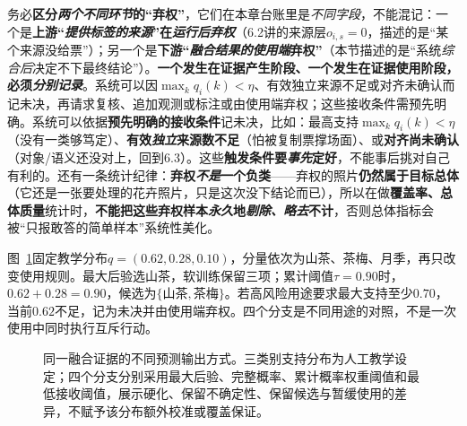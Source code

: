 务必\textbf{区分\emph{两个不同环节}的“弃权”}，它们在本章台账里是\emph{不同字段}，不能混记：一个是\textbf{上游“\emph{提供标签的来源}”在\emph{运行后弃权}}（6.2讲的来源层$o_{i,s}=0$，描述的是“某个来源没给票”）；另一个是\textbf{下游“\emph{融合结果的使用端}弃权”}（本节描述的是“系统\emph{综合后}决定不下最终结论”）。\textbf{一个发生在证据产生阶段、一个发生在证据使用阶段，必须\emph{分别记录}}。系统可以因$\max_kq_i(k)<\eta$、有效独立来源不足或对齐未确认而记未决，再请求复核、追加观测或标注或由使用端弃权；这些接收条件需预先明确。系统可以依据\textbf{预先明确的接收条件}记未决，比如：最高支持$\max_k q_i(k)<\eta$（没有一类够笃定）、\textbf{有效\emph{独立}来源数不足}（怕被复制票撑场面）、或\textbf{对齐尚未确认}（对象/语义还没对上，回到6.3）。这些\textbf{触发条件要\emph{事先}定好}，不能事后挑对自己有利的。还有一条统计纪律：\textbf{弃权\emph{不是}一个负类}——弃权的照片\textbf{仍然属于目标总体}（它还是一张要处理的花卉照片，只是这次没下结论而已），所以在做\textbf{覆盖率、总体质量}统计时，\textbf{不能把这些弃权样本\emph{永久}地\emph{剔除、略去}不计}，否则总体指标会被“只报敢答的简单样本”系统性美化。

图~\ref{fig:knowledge-fusion-output-forms}固定教学分布$q=(0.62,0.28,0.10)$，分量依次为山茶、茶梅、月季，再只改变使用规则。最大后验选山茶，软训练保留三项；累计阈值$\tau=0.90$时，$0.62+0.28=0.90$，候选为$\{\text{山茶},\text{茶梅}\}$。若高风险用途要求最大支持至少$0.70$，当前$0.62$不足，记为未决并由使用端弃权。四个分支是不同用途的对照，不是一次使用中同时执行互斥行动。

\begin{figure}[htbp]
  \centering
  
  \caption{同一融合证据的不同预测输出方式。三类别支持分布为人工教学设定；四个分支分别采用最大后验、完整概率、累计概率权重阈值和最低接收阈值，展示硬化、保留不确定性、保留候选与暂缓使用的差异，不赋予该分布额外校准或覆盖保证。}
  \label{fig:knowledge-fusion-output-forms}
\end{figure}
\FloatBarrier

